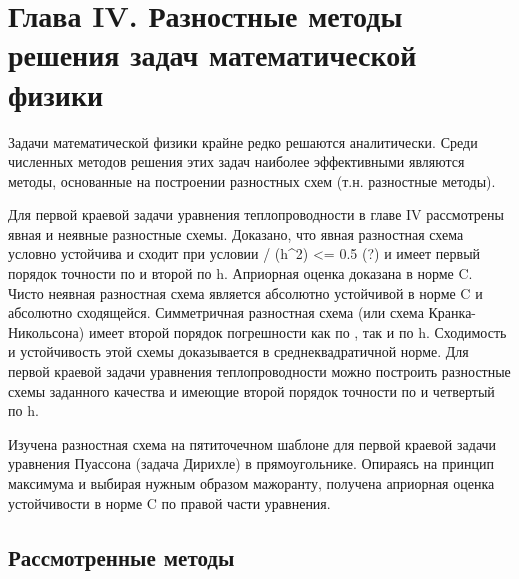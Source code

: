 \newpage
{}
\pagestyle{empty}
\vspace{0.5cm}

\section{Глава IV. Разностные методы решения задач математической физики}
Задачи математической физики крайне редко решаются аналитически. Среди численных методов решения этих задач наиболее эффективными являются методы, основанные на построении разностных схем (т.н. разностные методы).

Для первой краевой задачи уравнения теплопроводности в главе IV рассмотрены явная и неявные разностные схемы. Доказано, что явная разностная схема условно устойчива и сходит при условии \tau / (h^2) <= 0.5 (?) и имеет первый порядок точности по \tau и второй по h. Априорная оценка доказана в норме C. Чисто неявная разностная схема является абсолютно устойчивой в норме C и абсолютно сходящейся. Симметричная разностная схема (или схема Кранка-Никольсона) имеет второй порядок погрешности как по \tau, так и по h. Сходимость и устойчивость этой схемы доказывается в среднеквадратичной норме. Для первой краевой задачи уравнения теплопроводности можно построить разностные схемы заданного качества и имеющие второй порядок точности по \tau и четвертый по h.

Изучена разностная схема на пятиточечном шаблоне для первой краевой задачи уравнения Пуассона (задача Дирихле) в прямоугольнике. Опираясь на принцип максимума и выбирая нужным образом мажоранту, получена априорная оценка устойчивости в норме C по правой части уравнения.

\subsection{Рассмотренные методы}
